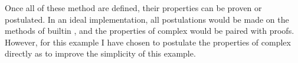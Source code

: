 Once all of these method are defined, their properties can be proven or
postulated.
In an ideal implementation, all postulations would be made on the methods of 
builtin , and the properties of complex would be paired with proofs.
However, for this example I have chosen to postulate the properties
of complex directly as to improve the simplicity of this example.

\begin{code}[hide]%
\>[0]\<%
\\
\>[0]\AgdaSpace{}%
\AgdaSpace{}%
\AgdaSymbol{(}\AgdaSpace{}%
\AgdaSymbol{:}\AgdaSpace{}%
\AgdaSymbol{)}\AgdaSpace{}%
\<%
\\
\>[0][@{}l@{\AgdaIndent{0}}]%
\>[2]\AgdaSpace{}%
\AgdaSpace{}%
\AgdaSpace{}%
\AgdaSpace{}%
\AgdaSymbol{(}\AgdaSymbol{;}\AgdaSpace{}%
\AgdaSymbol{;}\AgdaSpace{}%
\AgdaSymbol{;}\AgdaSpace{}%
\AgdaSymbol{;}\AgdaSpace{}%
\AgdaSymbol{)}\AgdaSpace{}%
\AgdaSpace{}%
\AgdaSymbol{(}\AgdaOperator{\AgdaField{-\AgdaUnderscore{}}}\AgdaSpace{}%
\AgdaSpace{}%
\AgdaSymbol{;}\<%
\\
\>[2][@{}l@{\AgdaIndent{0}}]%
\>[6]\AgdaOperator{\AgdaField{\AgdaUnderscore{}+\AgdaUnderscore{}}}\AgdaSpace{}%
\AgdaSpace{}%
\AgdaSymbol{;}\AgdaSpace{}%
\AgdaOperator{\AgdaField{\AgdaUnderscore{}-\AgdaUnderscore{}}}\AgdaSpace{}%
\AgdaSpace{}%
\AgdaSymbol{;}\AgdaSpace{}%
\AgdaOperator{\AgdaField{\AgdaUnderscore{}*\AgdaUnderscore{}}}\AgdaSpace{}%
\AgdaSpace{}%
\AgdaSymbol{;}\AgdaSpace{}%
\AgdaOperator{\AgdaField{\AgdaUnderscore{}/\AgdaUnderscore{}}}\AgdaSpace{}%
\AgdaSpace{}%
\AgdaSymbol{)}\<%
\\
%
\\[\AgdaEmptyExtraSkip]%
%
\>[2]\AgdaSpace{}%
\AgdaSpace{}%
\<%
\\
\>[2][@{}l@{\AgdaIndent{0}}]%
\>[4]\AgdaSpace{}%
\AgdaSpace{}%

\end{code}
